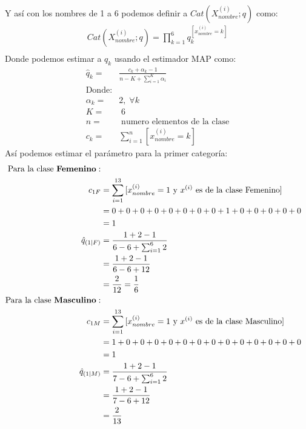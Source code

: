\documentclass[12pt]{article}
\begin{document}
 \paragraph{}Y así con los nombres de 1 a 6 podemos definir a $Cat(X_{nombre}^{(i)};q)$ como:\\
 \begin{equation}
 \begin{split}
 Cat(X_{nombre}^{(i)};q) = \prod_{k=1}^{6}q_{k}^{[x_{nombre}^{(i)}=k ]}\\
 \end{split}
 \end{equation}
 Donde podemos estimar a $q_k$ usando el estimador MAP como:
 \begin{equation}
 \begin{split}
 \hat{q}_k =& \frac{c_k + \alpha_k - 1}{n - K + \sum_{i=1}^{K}{\alpha_i}} \\ 
 \text{Donde:}&\\
 \alpha_k =& 2,\; \forall k\\
 K =& \; 6\\
 n =& \; \text{numero elementos de la clase}\\
 c_k =& \sum_{i = 1}^{n}{[x^{(i)}_{nombre}=k]}
 \end{split}
 \end{equation}
 Así podemos estimar el parámetro para la primer categoría:\\
 \begin{equation}
 \begin{split}
 \text{Para la clase \textbf{Femenino}}:\\
 c_{1F} &= \sum_{i = 1}^{13}{[x^{(i)}_{nombre}=1 \text{ y $x^{(i)}$ es de la clase Femenino}]}\\
 &= 0 + 0 + 0 + 0 + 0 + 0 + 0 + 0 + 1 + 0 + 0 + 0 + 0 + 0\\
 &= 1\\
 \hat{q}_{(1|F)} &= \frac{1 + 2 - 1}{6 - 6 + \sum_{i=1}^{6}{2}} \\
 &= \frac{1 + 2 - 1}{6 - 6 + 12} \\  
 &= \frac{2}{12} = \frac{1}{6} \\
 \text{Para la clase \textbf{Masculino}}:\\
 c_{1M} &= \sum_{i = 1}^{13}{[x^{(i)}_{nombre}=1 \text{ y $x^{(i)}$ es de la clase Masculino}]}\\
 &= 1 + 0 + 0 + 0 + 0 + 0 + 0 + 0 + 0 + 0 + 0 + 0 + 0 + 0\\
 &= 1\\
 \hat{q}_{(1|M)} &= \frac{1 + 2 - 1}{7 - 6 + \sum_{i=1}^{6}{2}} \\
 &= \frac{1 + 2 - 1}{7 - 6 + 12} \\  
 &= \frac{2}{13} \\
 \end{split}
 \end{equation}
\end{document}
